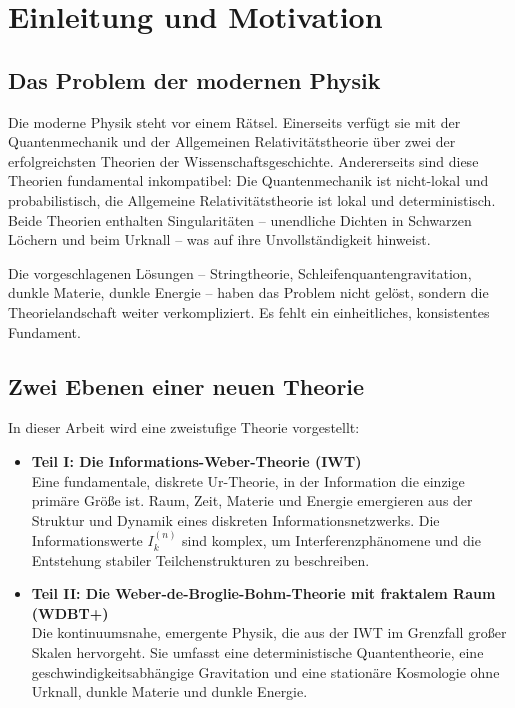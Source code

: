 
\chapter{Einleitung und Motivation}
\label{ch:einleitung}

\section{Das Problem der modernen Physik}
\label{sec:problem_der_modernen_physik}

Die moderne Physik steht vor einem Rätsel. Einerseits verfügt sie mit der Quantenmechanik und der Allgemeinen Relativitätstheorie über zwei der erfolgreichsten Theorien der Wissenschaftsgeschichte. Andererseits sind diese Theorien fundamental inkompatibel: Die Quantenmechanik ist nicht-lokal und probabilistisch, die Allgemeine Relativitätstheorie ist lokal und deterministisch. Beide Theorien enthalten Singularitäten – unendliche Dichten in Schwarzen Löchern und beim Urknall – was auf ihre Unvollständigkeit hinweist.

Die vorgeschlagenen Lösungen – Stringtheorie, Schleifenquantengravitation, dunkle Materie, dunkle Energie – haben das Problem nicht gelöst, sondern die Theorielandschaft weiter verkompliziert. Es fehlt ein einheitliches, konsistentes Fundament.

\section{Zwei Ebenen einer neuen Theorie}
\label{sec:zwei_ebenen}

In dieser Arbeit wird eine zweistufige Theorie vorgestellt:

\begin{itemize}
    \item \textbf{Teil I: Die Informations-Weber-Theorie (IWT)} \\
    Eine fundamentale, diskrete Ur-Theorie, in der Information die einzige primäre Größe ist. Raum, Zeit, Materie und Energie emergieren aus der Struktur und Dynamik eines diskreten Informationsnetzwerks. Die Informationswerte \( I_k^{(n)} \) sind komplex, um Interferenzphänomene und die Entstehung stabiler Teilchenstrukturen zu beschreiben.
    
    \item \textbf{Teil II: Die Weber-de-Broglie-Bohm-Theorie mit fraktalem Raum (WDBT+)} \\
    Die kontinuumsnahe, emergente Physik, die aus der IWT im Grenzfall großer Skalen hervorgeht. Sie umfasst eine deterministische Quantentheorie, eine geschwindigkeitsabhängige Gravitation und eine stationäre Kosmologie ohne Urknall, dunkle Materie und dunkle Energie.
\end{itemize}

